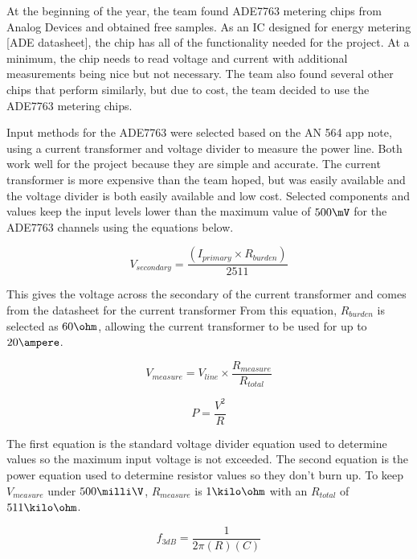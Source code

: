 At the beginning of the year, the team found ADE7763 metering chips from Analog Devices and obtained free samples. As an IC designed for energy metering [ADE datasheet], the chip has all of the functionality needed for the project. At a minimum, the chip needs to read voltage and current with additional measurements being nice but not necessary. The team also found several other chips that perform similarly, but due to cost, the team decided to use the ADE7763 metering chips. 

Input methods for the ADE7763 were selected based on the AN 564 app note, using a current transformer and voltage divider to measure the power line. Both work well for the project because they are simple and accurate. The current transformer is more expensive than the team hoped, but was easily available and the voltage divider is both easily available and low cost. Selected components and values keep the input levels lower than the maximum value of $500 \mV$ %
for the ADE7763 channels using the equations below.

\begin{equation}
V_{secondary}=\frac{(I_{primary}\times R_{burden})}{2511}
\end{equation}

This gives the voltage across the secondary of the current transformer and comes from the datasheet for the current transformer %
From this equation, $R_{burden}$ is selected as $60 \ohm$, allowing the current transformer to be used for up to $20\ampere$.

\begin{equation}
V_{measure}=V_{line}\times \frac{R_{measure}}{R_{total}}
\end{equation}

\begin{equation}
P=\frac{V^2}{R}
\end{equation}

The first equation is the standard voltage divider equation used to determine values so the maximum input voltage is not exceeded. The second equation is the power equation used to determine resistor values so they don't burn up. To keep $V_{measure}$ under $500\milli \V$, $R_{measure}$ is $1\kilo\ohm$ with an $R_{total}$ of $511\kilo\ohm$. 

\begin{equation}
f_{3dB}=\frac{1}{2\pi(R)(C)}
\end{equation}

